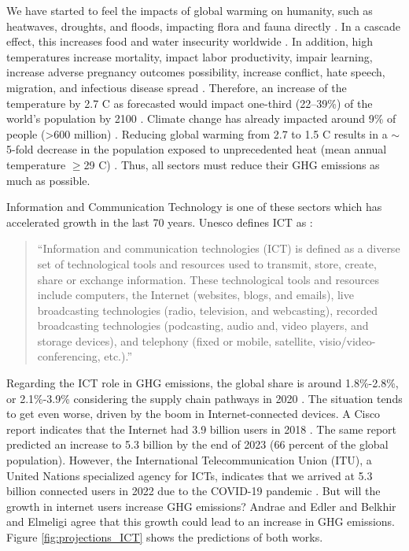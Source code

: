 We have started to feel the impacts of global warming on humanity, such as heatwaves, droughts, and floods, impacting flora and fauna directly \cite{masson2018global, change2022threat}. In a cascade effect, this increases food and water insecurity worldwide \cite{change2022threat, doi:10.1126/science.1239402}. In addition, high temperatures increase mortality, impact labor productivity, impair learning, increase adverse pregnancy outcomes possibility, increase conflict, hate speech, migration, and infectious disease spread \cite{lenton2023quantifying}. Therefore, an increase of the temperature by 2.7 \degree C as forecasted would impact one-third (22–39\%) of the world's population by 2100 \cite{lenton2023quantifying}. Climate change has already impacted around 9\% of people (>600 million) \cite{lenton2023quantifying}. Reducing global warming from 2.7 to 1.5 \degree C results in a $\sim$5-fold decrease in the population exposed to unprecedented heat (mean annual temperature $\geq$29 \degree C) \cite{lenton2023quantifying}. Thus, all sectors must reduce their GHG emissions as much as possible.

Information and Communication Technology is one of these sectors which has accelerated growth in the last 70 years. Unesco defines ICT as \cite{unesco2009guide}:

\begin{quote}
    ``Information and communication technologies (ICT) is defined as a diverse set of technological tools and resources used to transmit, store, create, share or exchange information. These technological tools and resources include computers, the Internet (websites, blogs, and emails), live broadcasting technologies (radio, television, and webcasting), recorded broadcasting technologies (podcasting, audio and, video players, and storage devices), and telephony (fixed or mobile, satellite, visio/video-conferencing, etc.).''
\end{quote}

Regarding the ICT role in GHG emissions, the global share is around 1.8\%-2.8\%, or 2.1\%-3.9\% considering the supply chain pathways in 2020 \cite{freitag2021climate}. The situation tends to get even worse, driven by the boom in Internet-connected devices. A Cisco report indicates that the Internet had 3.9 billion users in 2018 \cite{cisco2020cisco}. The same report predicted an increase to 5.3 billion by the end of 2023 (66 percent of the global population). However, the International Telecommunication Union (ITU), a United Nations specialized agency for ICTs, indicates that we arrived at 5.3 billion connected users in 2022 due to the COVID-19 pandemic \cite{ITU2022}. But will the growth in internet users increase GHG emissions? Andrae and Edler \cite{andrae2015global} and Belkhir and Elmeligi \cite{belkhir2018assessing} agree that this growth could lead to an increase in GHG emissions. Figure \ref{fig:projections_ICT} shows the predictions of both works.

